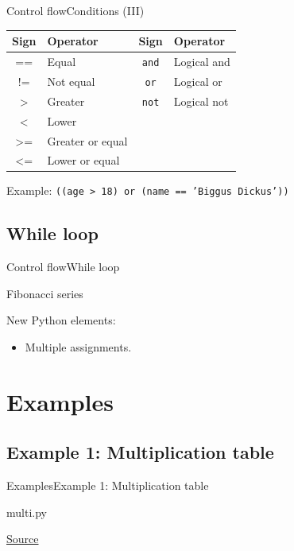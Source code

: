 \documentclass[10pt,compress]{beamer} %
\begin{document}
\begin{frame}[fragile]{Control flow}{Conditions (III)}
	\centering \begin{tabular}{cl|cl}\hline
	\sc Sign & \sc Operator & \sc Sign 	& \sc Operator \\ \hline
	== 	 & Equal   		& \texttt{and} 	& Logical and \\
	!= 	& Not equal  	& \texttt{or}	& Logical or  \\
	> 	& Greater 		& \texttt{not}	& Logical not \\
	< 	& Lower			&   	& \\
	>= 	& Greater or equal 		& 	& \\
	<= 	& Lower or equal 		& 	& \\\hline
	\end{tabular}

	\bigskip

	Example: \texttt{((age > 18) or (name == 'Biggus Dickus'))}
\end{frame}

\subsection{While loop}
\begin{frame}{Control flow}{While loop}
	\begin{block}{Fibonacci series}
	\vspace{-0.2cm}
		
	\end{block}

    New Python elements:
	\begin{itemize}
	\item Multiple assignments.
	\end{itemize}
	
\end{frame}

\section{Examples}
\subsection{Example 1: Multiplication table}
\begin{frame}{Examples}{Example 1: Multiplication table}
	\begin{block}{multi.py}
		
	\end{block}
		\tiny{\href{http://www.pythonforbeginners.com/basics/using-math-in-python/}{Source}}
\end{frame}
\end{document}

